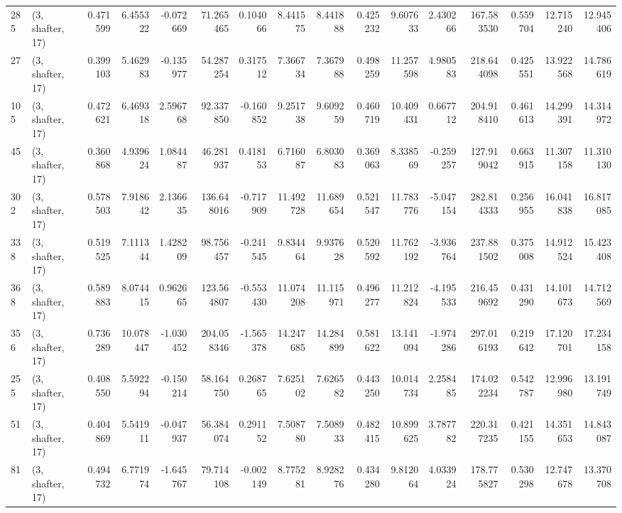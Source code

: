 \begin{tabular}{llrrrrrrrrrrrrrr}
285 &  (3, shafter, 17) &   0.471599 &   6.455322 &  -0.072669 &    71.265465 &   0.104066 &   8.441575 &   8.441888 &  0.425232 &   9.607633 &   2.430266 &   167.583530 &   0.559704 &  12.715240 &  12.945406 \\
27  &  (3, shafter, 17) &   0.399103 &   5.462983 &  -0.135977 &    54.287254 &   0.317512 &   7.366734 &   7.367988 &  0.498259 &  11.257598 &   4.980583 &   218.644098 &   0.425551 &  13.922568 &  14.786619 \\
105 &  (3, shafter, 17) &   0.472621 &   6.469318 &   2.596768 &    92.337850 &  -0.160852 &   9.251738 &   9.609259 &  0.460719 &  10.409431 &   0.667712 &   204.918410 &   0.461613 &  14.299391 &  14.314972 \\
45  &  (3, shafter, 17) &   0.360868 &   4.939624 &   1.084487 &    46.281937 &   0.418153 &   6.716087 &   6.803083 &  0.369063 &   8.338569 &  -0.259257 &   127.919042 &   0.663915 &  11.307158 &  11.310130 \\
302 &  (3, shafter, 17) &   0.578503 &   7.918642 &   2.136635 &   136.648016 &  -0.717909 &  11.492728 &  11.689654 &  0.521547 &  11.783776 &  -5.047154 &   282.814333 &   0.256955 &  16.041838 &  16.817085 \\
338 &  (3, shafter, 17) &   0.519525 &   7.111344 &   1.428209 &    98.756457 &  -0.241545 &   9.834464 &   9.937628 &  0.520592 &  11.762192 &  -3.936764 &   237.881502 &   0.375008 &  14.912524 &  15.423408 \\
368 &  (3, shafter, 17) &   0.589883 &   8.074415 &   0.962665 &   123.564807 &  -0.553430 &  11.074208 &  11.115971 &  0.496277 &  11.212824 &  -4.195533 &   216.459692 &   0.431290 &  14.101673 &  14.712569 \\
356 &  (3, shafter, 17) &   0.736289 &  10.078447 &  -1.030452 &   204.058346 &  -1.565378 &  14.247685 &  14.284899 &  0.581622 &  13.141094 &  -1.974286 &   297.016193 &   0.219642 &  17.120701 &  17.234158 \\
255 &  (3, shafter, 17) &   0.408550 &   5.592294 &  -0.150214 &    58.164750 &   0.268765 &   7.625102 &   7.626582 &  0.443250 &  10.014734 &   2.258485 &   174.022234 &   0.542787 &  12.996980 &  13.191749 \\
51  &  (3, shafter, 17) &   0.404869 &   5.541911 &  -0.047937 &    56.384074 &   0.291152 &   7.508780 &   7.508933 &  0.482415 &  10.899625 &   3.787782 &   220.317235 &   0.421155 &  14.351653 &  14.843087 \\
81  &  (3, shafter, 17) &   0.494732 &   6.771974 &  -1.645767 &    79.714108 &  -0.002149 &   8.775281 &   8.928276 &  0.434280 &   9.812064 &   4.033924 &   178.775827 &   0.530298 &  12.747678 &  13.370708 \\

\end{tabular}
